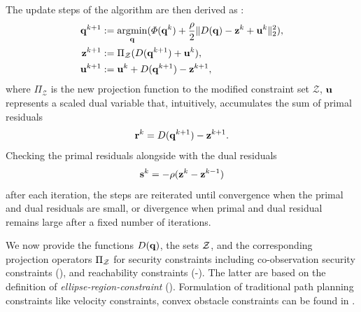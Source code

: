 \documentclass[10pt,twocolumn,twoside]{IEEEtran}
\begin{document}
The update steps of the algorithm are then derived as \cite{Boyd2011}:
\begin{subequations}\label{eq:ADMMupdate}
	\begin{align}
		\label{eq:admm-mod-update-q}\mathbf{q}^{k+1}&:=\operatorname*{\arg\!\min}_{\mathbf{q}}(\varPhi(\mathbf{q}^k) +\frac{\rho}{2}\lVert D(\mathbf{q})-\mathbf{z}^k+\mathbf{u}^k\rVert_2^2),\\
		\mathbf{z}^{k+1}&:=\Pi_\mathcal{Z}(D(\mathbf{q}^{k+1})+\mathbf{u}^k), \label{eq:z-update} \\
		\mathbf{u}^{k+1}&:=\mathbf{u}^k+D(\mathbf{q}^{k+1})-\mathbf{z}^{k+1},
	\end{align}
\end{subequations}
where $\Pi_\mathcal{Z}$ is the new projection function to the modified constraint set $\mathcal{Z}$, $\mathbf{u}$ represents a scaled dual variable that, intuitively, accumulates the sum of primal residuals
\begin{equation}\label{eq:primal-residual}
	\mathbf{r}^{k}=D(\mathbf{q}^{k+1})-\mathbf{z}^{k+1}.
\end{equation}
Checking the primal residuals alongside with the dual residuals 
\begin{equation}\label{eq:dual-residual}
	\mathbf{s}^{k}=-\rho(\mathbf{z}^{k}-\mathbf{z}^{k-1})
\end{equation}
after each iteration, the steps are reiterated until convergence when the primal and dual residuals are small, or divergence when primal and dual residual remains large after a fixed number of iterations.

We now provide the functions $D(\mathbf{q})$, the sets $\mathcal{Z}$, and the corresponding projection operators $\Pi_{\mathcal{Z}}$ for security constraints including co-observation security constraints (), and reachability constraints (-). The latter are based on the definition of \emph{ellipse-region-constraint} ().
Formulation of traditional path planning constraints like velocity constraints, convex obstacle constraints can be found in \cite{yang2020multi}.
\end{document}
